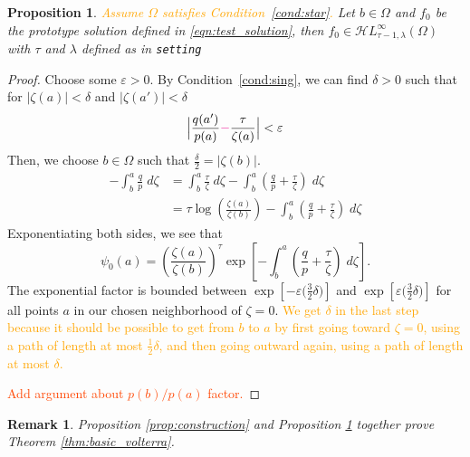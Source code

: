 \documentclass{article}
\theoremstyle{plain}
\newtheorem{prop}{Proposition}
\newtheorem{rmk}{Remark}
\newcommand{\singexp}[2]{\mathcal{H}L^\infty_{#1, #2}}
\newcommand{\domain}{\Omega}
\begin{document}
\begin{prop}\label{prop:asymptotic at zero}
    \textcolor{orange}{Assume $\domain$ satisfies Condition~\eqref{cond:star}.} Let $b\in\Omega$ and $f_0$ be the prototype solution defined in \eqref{eqn:test_solution}, then $f_0\in\singexp{\tau-1}{\lambda}(\Omega)$ with $\tau$ and $\lambda$ defined as in {\tt setting}
\end{prop}

\begin{proof}
Choose some $\varepsilon>0$. By Condition~\eqref{cond:sing}, we can find $\delta>0$ such that for $|\zeta(a)|<\delta$ and $|\zeta(a')|<\delta$
\begin{equation}\label{eqn:limit_h1}
\Big\vert\frac{q(a')}{p(a)}\textcolor{magenta}{-}\frac{\tau}{\zeta(a)}\Big\vert<\varepsilon
\end{equation}
 Then, we choose $b\in\Omega$ such that $\tfrac{\delta}{2}=|\zeta(b)|$.
\begin{align*}
-\int_b^a \frac{q}{p}\;d\zeta & = \int_b^a \frac{\tau}{\zeta}\;d\zeta - \int_b^a \left( \frac{q}{p} + \frac{\tau}{\zeta} \right)\;d\zeta \\
& = \tau \log\left(\frac{\zeta(a)}{\zeta(b)}\right) - \int_b^a \left( \frac{q}{p} + \frac{\tau}{\zeta} \right)\;d\zeta
\end{align*}
Exponentiating both sides, we see that
\[ \psi_0(a) = \left(\frac{\zeta(a)}{\zeta(b)}\right)^\tau \exp\left[-\int_b^a \left( \frac{q}{p} + \frac{\tau}{\zeta} \right)\;d\zeta\right]. \]
The exponential factor is bounded between $\exp[-\varepsilon\big(\tfrac{3}{2} \delta\big)]$ and $\exp[\varepsilon\big(\tfrac{3}{2} \delta\big)]$ for all points $a$ in our chosen neighborhood of $\zeta = 0$.
\textcolor{orange}{We get $\delta$ in the last step because it should be possible to get from $b$ to $a$ by first going toward $\zeta = 0$, using a path of length at most $\tfrac{1}{2} \delta$, and then going outward again, using a path of length at most $\delta$.}

\textcolor{OrangeRed}{Add argument about $p(b)/p(a)$ factor.}
\end{proof}

\begin{rmk}
    Proposition \ref{prop:construction} and Proposition \ref{prop:asymptotic at zero} together prove Theorem \ref{thm:basic_volterra}. 
\end{rmk}
\end{document}
